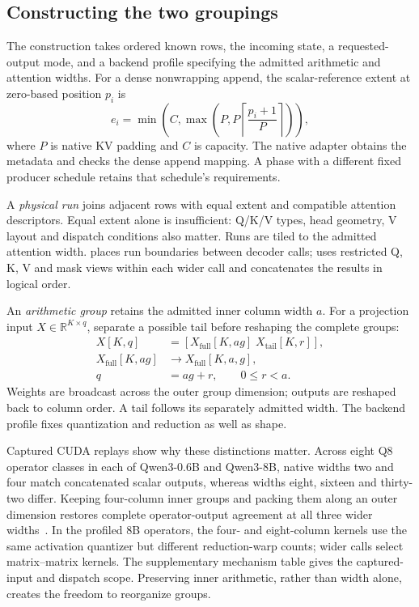 \subsection{Constructing the two groupings}
The construction takes ordered known rows, the incoming state, a requested-output mode, and a backend profile specifying the admitted arithmetic and attention widths. For a dense nonwrapping append, the scalar-reference extent at zero-based position $p_i$ is
\begin{equation}
 e_i=\min\!\left(C,\max\!\left(P,
 P\left\lceil\frac{p_i+1}{P}\right\rceil\right)\right),
 \label{eq:physical-extent}
\end{equation}
where $P$ is native KV padding and $C$ is capacity. The native adapter obtains the metadata and checks the dense append mapping. A phase with a different fixed producer schedule retains that schedule's requirements.

A \emph{physical run} joins adjacent rows with equal extent and compatible attention descriptors. Equal extent alone is insufficient: Q/K/V types, head geometry, V layout and dispatch conditions also matter. Runs are tiled to the admitted attention width. \Simple{} places run boundaries between decoder calls; \Local{} uses restricted Q, K, V and mask views within each wider call and concatenates the results in logical order.

An \emph{arithmetic group} retains the admitted inner column width $a$. For a projection input $X\in\mathbb{R}^{K\times q}$, separate a possible tail before reshaping the complete groups:
\begin{equation}
 \begin{split}
 X[K,q]&=[X_{\mathrm{full}}[K,ag]\;X_{\mathrm{tail}}[K,r]],\\
 X_{\mathrm{full}}[K,ag]&\longrightarrow X_{\mathrm{full}}[K,a,g],\\
 q&=ag+r,\qquad 0\le r<a.
 \end{split}
 \label{eq:arithmetic-groups}
\end{equation}
Weights are broadcast across the outer group dimension; outputs are reshaped back to column order. A tail follows its separately admitted width. The backend profile fixes quantization and reduction as well as shape.

Captured CUDA replays show why these distinctions matter. Across eight Q8 operator classes in each of Qwen3-0.6B and Qwen3-8B, native widths two and four match concatenated scalar outputs, whereas widths eight, sixteen and thirty-two differ. Keeping four-column inner groups and packing them along an outer dimension restores complete operator-output agreement at all three wider widths~\cite{records}. In the profiled 8B operators, the four- and eight-column kernels use the same activation quantizer but different reduction-warp counts; wider calls select matrix--matrix kernels. The supplementary mechanism table gives the captured-input and dispatch scope. Preserving inner arithmetic, rather than width alone, creates the freedom to reorganize groups.

